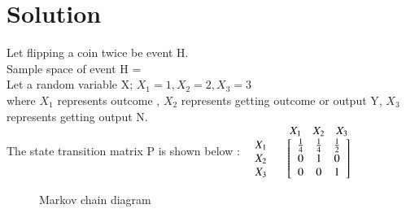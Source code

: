 \documentclass[journal,12pt,twocolumn]{IEEEtran}
\begin{document}
\section*{Solution}
Let flipping a coin twice be event H.\\
Sample space of event H = \\
Let a random variable X; $X_{1}=1, X_{2}=2, X_{3}=3$ \\
where $X_{1}$ represents outcome , $X_{2}$ represents getting outcome  or output Y, $X_{3}$ represents getting output N.\\
The state transition matrix P is shown below :
$\begin{array}{c c} &
\begin{array}{c c c} X_{1}  & X_{2} & X_{3} \\
\end{array}
\\
\begin{array}{c c c}
X_{1} \\
X_{2}\\
X_{3}
\end{array}
&
\left[
\begin{array}{c c c}
\frac{1}{4} & \frac{1}{4} & \frac{1}{2} \\
0 & 1 & 0 \\
0 & 0 & 1 
\end{array}
\right]
\end{array}$
\\
\begin{figure}[h]
\caption*{Markov chain diagram}
\centering

\end{figure}\\
\end{document}
